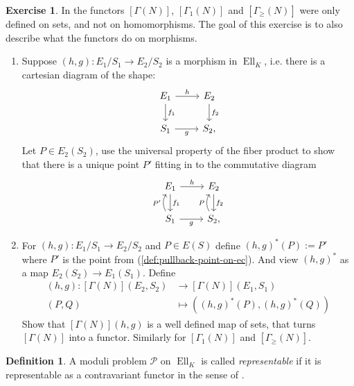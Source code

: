 \documentclass[a4paper,12pt,reqno]{amsart}
\DeclareMathOperator{\Ell}{Ell}
\theoremstyle{definition}
\newtheorem{definition}[lemma]{Definition}
\newtheorem{exercise}[lemma]{Exercise}
\numberwithin{lemma}{section}
\numberwithin{equation}{section}
\numberwithin{figure}{section}
\begin{document}
\begin{exercise}
In  the functors $[\Gamma(N)]$, $[\Gamma_1(N)]$ and $[\Gamma_\geq(N)]$ were only defined on sets, and not on homomorphisms.  The goal of this exercise is to also describe what the functors do on morphisms.
\begin{enumerate}
\item Suppose $(h,g): E_1/S_1 \to E_2/S_2$ is a morphism in $\Ell_K$, i.e. there is a cartesian diagram of the shape:
	\[
\begin{tikzcd}
E_1 \arrow[r,"h"] \arrow[d,"f_1"] & E_2 \arrow[d, "f_2"] \\
S_1 \arrow[r, "g"'] & S_2,
\end{tikzcd}
\]
Let $P \in E_2(S_2)$, use the universal property of the fiber product to show that there is a unique point $P'$ fitting in to the commutative diagram
	\[
\begin{tikzcd}
E_1 \arrow[r,"h"] \arrow[d,"f_1"] & E_2 \arrow[d, "f_2"] \\
S_1  \arrow[u, bend left,"P'"] \arrow[r, "g"'] & S_2 \arrow[u, bend left, "P"], \label{def:pullback-point-on-ec}
\end{tikzcd}
\]
\item For $(h,g): E_1/S_1 \to E_2/S_2$  and $P\in E(S)$ define  $(h,g)^*(P) := P'$ where $P'$ is the point from (\ref{def:pullback-point-on-ec}). And view $(h,g)^*$ as a map $E_2(S_2) \to E_1(S_1)$. Define 
\begin{align*}
[\Gamma(N)](h,g) : [\Gamma(N)](E_2,S_2) &\to [\Gamma(N)](E_1,S_1) \\
 (P,Q) &\mapsto ((h,g)^*(P),(h,g)^*(Q) )
\end{align*}
Show that $[\Gamma(N)](h,g)$ is a well defined map of sets, that turns $[\Gamma(N)]$ into a functor. Similarly for $[\Gamma_1(N)]$ and $[\Gamma_\geq(N)]$.
\end{enumerate}
\end{exercise}


\begin{definition}\label{def:representable-moduli-problem}
	A moduli problem $\mathcal P$ on $\Ell_K$ is called {\it representable} if it is representable as a contravariant functor in the sense of .
\end{definition}
\end{document}
